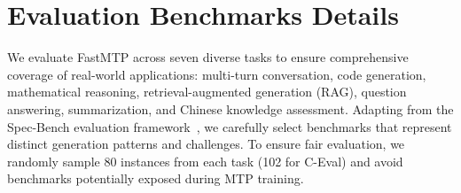 \documentclass{article} %
\begin{document}


\section{Evaluation Benchmarks Details} \label{app:bench}

We evaluate FastMTP across seven diverse tasks to ensure comprehensive coverage of real-world applications: multi-turn conversation, code generation, mathematical reasoning, retrieval-augmented generation (RAG), question answering, summarization, and Chinese knowledge assessment. Adapting from the Spec-Bench evaluation framework~\citep{xia2024unlocking}, we carefully select benchmarks that represent distinct generation patterns and challenges. To ensure fair evaluation, we randomly sample 80 instances from each task (102 for C-Eval) and avoid benchmarks potentially exposed during MTP training.
\end{document}
